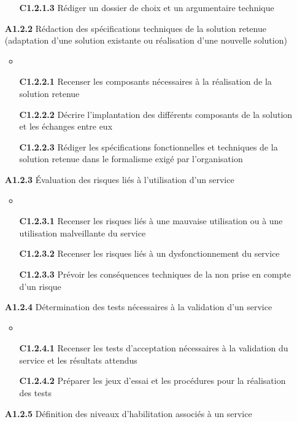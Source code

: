 \documentclass[12pt,a4paper,oneside,titlepage,final]{article}
\begin{document}
\begin{enumerate}
\begin{itemize}
    \item [\textbf{C1.2.1.3}] Rédiger un dossier de choix et un
    argumentaire technique
  \end{itemize}
  \item [\textbf{A1.2.2}] Rédaction des spécifications techniques de
  la solution retenue (adaptation d'une solution existante ou
  réalisation d'une nouvelle solution)
  \begin{itemize}
    \item \item [\textbf{C1.2.2.1}] Recenser les composants
    nécessaires à la réalisation de la solution retenue
    \item [\textbf{C1.2.2.2}] Décrire l'implantation des différents
    composants de la solution et les échanges entre eux
    \item [\textbf{C1.2.2.3}] Rédiger les spécifications
    fonctionnelles et techniques de la solution retenue dans le
    formalisme exigé par l'organisation
  \end{itemize}
  \item [\textbf{A1.2.3}] Évaluation des risques liés à l'utilisation
  d'un service
  \begin{itemize}
    \item \item [\textbf{C1.2.3.1}] Recenser les risques liés à une
    mauvaise utilisation ou à une utilisation malveillante du service
    \item [\textbf{C1.2.3.2}] Recenser les risques liés à un
    dysfonctionnement du service
    \item [\textbf{C1.2.3.3}] Prévoir les conséquences techniques de
    la non prise en compte d'un risque
  \end{itemize}
  \item [\textbf{A1.2.4}] Détermination des tests nécessaires à la
  validation d'un service
  \begin{itemize}
    \item \item [\textbf{C1.2.4.1}] Recenser les tests d'acceptation
    nécessaires à la validation du service et les résultats attendus
    \item [\textbf{C1.2.4.2}] Préparer les jeux d'essai et les
    procédures pour la réalisation des tests
  \end{itemize}
  \item [\textbf{A1.2.5}] Définition des niveaux d'habilitation
  associés à un service
  \begin{itemize}

\end{itemize}
\end{enumerate}
\end{document}
